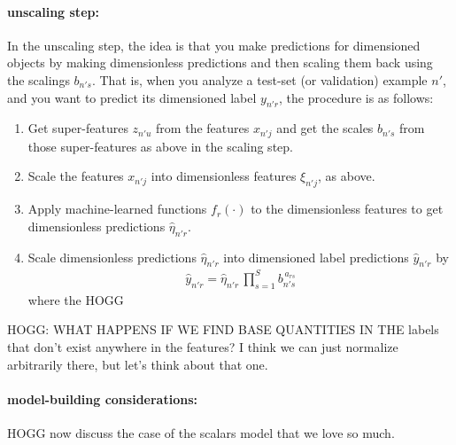 \documentclass[12pt, letterpaper]{article}
\begin{document}
\paragraph{unscaling step:}
In the unscaling step, the idea is that you make predictions for dimensioned objects by making dimensionless predictions and then scaling them back using the scalings $b_{n's}$.
That is, when you analyze a test-set (or validation) example $n'$, and you want to predict its dimensioned label $y_{n'r}$, the procedure is as follows:
\begin{enumerate}
    \item Get super-features $z_{n'u}$ from the features $x_{n'j}$ and get the scales $b_{n's}$ from those super-features as above in the scaling step.
    \item Scale the features $x_{n'j}$ into dimensionless features $\xi_{n'j}$, as above.
    \item Apply machine-learned functions $f_r(\cdot)$ to the dimensionless features to get dimensionless predictions $\hat{\eta}_{n'r}$.
    \item Scale dimensionless predictions $\hat{\eta}_{n'r}$ into dimensioned label predictions $\hat{y}_{n'r}$ by
    \begin{align}
        \hat{y}_{n'r} = \hat{\eta}_{n'r}\,\prod_{s=1}^S b_{n's}^{\,a_{rs}}
    \end{align}
    where the HOGG
\end{enumerate}

HOGG: WHAT HAPPENS IF WE FIND BASE QUANTITIES IN THE labels that don't exist anywhere in the features? I think we can just normalize arbitrarily there, but let's think about that one.

\paragraph{model-building considerations:}
HOGG now discuss the case of the scalars model that we love so much.
\end{document}
